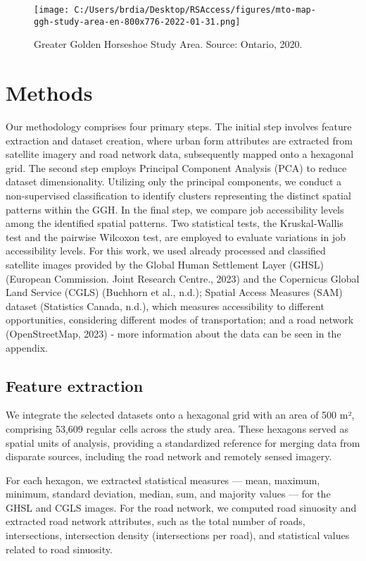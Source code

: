 \documentclass[conference,final,]{IEEEtran}
\begin{document}
\begin{figure}[!t]
\centering
\texttt{[image: C:/Users/brdia/Desktop/RSAccess/figures/mto-map-ggh-study-area-en-800x776-2022-01-31.png]}
\caption{Greater Golden Horseshoe Study Area. Source: Ontario, 2020.}
\label{fig:GGH}
\end{figure}

\hypertarget{methods}{%
\section{Methods}\label{methods}}

Our methodology comprises four primary steps. The initial step involves
feature extraction and dataset creation, where urban form attributes are
extracted from satellite imagery and road network data, subsequently
mapped onto a hexagonal grid. The second step employs Principal
Component Analysis (PCA) to reduce dataset dimensionality. Utilizing
only the principal components, we conduct a non-supervised
classification to identify clusters representing the distinct spatial
patterns within the GGH. In the final step, we compare job accessibility
levels among the identified spatial patterns. Two statistical tests, the
Kruskal-Wallis test and the pairwise Wilcoxon test, are employed to
evaluate variations in job accessibility levels. For this work, we used
already processed and classified satellite images provided by the Global
Human Settlement Layer (GHSL) (European Commission. Joint Research
Centre., 2023) and the Copernicus Global Land Service (CGLS) (Buchhorn
et al., n.d.); Spatial Access Measures (SAM) dataset (Statistics Canada,
n.d.), which measures accessibility to different opportunities,
considering different modes of transportation; and a road network
(OpenStreetMap, 2023) - more information about the data can be seen in
the appendix.

\hypertarget{feature-extraction}{%
\subsection{Feature extraction}\label{feature-extraction}}

We integrate the selected datasets onto a hexagonal grid with an area of
500 m², comprising 53,609 regular cells across the study area. These
hexagons served as spatial units of analysis, providing a standardized
reference for merging data from disparate sources, including the road
network and remotely sensed imagery.

For each hexagon, we extracted statistical measures --- mean, maximum,
minimum, standard deviation, median, sum, and majority values --- for
the GHSL and CGLS images. For the road network, we computed road
sinuosity and extracted road network attributes, such as the total
number of roads, intersections, intersection density (intersections per
road), and statistical values related to road sinuosity.
\end{document}
